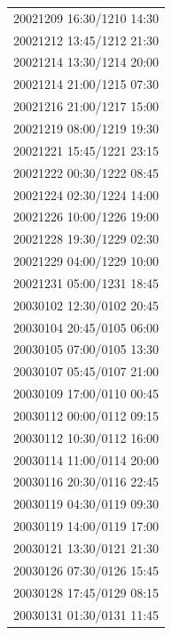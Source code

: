 \documentclass[linenumbers,draft]{agujournal}
\begin{document}
\begin{center}
\begin{longtable}{c}
20021209 16:30/1210 14:30 \\
20021212 13:45/1212 21:30 \\
20021214 13:30/1214 20:00 \\
20021214 21:00/1215 07:30 \\
20021216 21:00/1217 15:00 \\
20021219 08:00/1219 19:30 \\
20021221 15:45/1221 23:15 \\
20021222 00:30/1222 08:45 \\
20021224 02:30/1224 14:00 \\
20021226 10:00/1226 19:00 \\
20021228 19:30/1229 02:30 \\
20021229 04:00/1229 10:00 \\
20021231 05:00/1231 18:45 \\
20030102 12:30/0102 20:45 \\
20030104 20:45/0105 06:00 \\
20030105 07:00/0105 13:30 \\
20030107 05:45/0107 21:00 \\
20030109 17:00/0110 00:45 \\
20030112 00:00/0112 09:15 \\
20030112 10:30/0112 16:00 \\
20030114 11:00/0114 20:00 \\
20030116 20:30/0116 22:45 \\
20030119 04:30/0119 09:30 \\
20030119 14:00/0119 17:00 \\
20030121 13:30/0121 21:30 \\
20030126 07:30/0126 15:45 \\
20030128 17:45/0129 08:15 \\
20030131 01:30/0131 11:45 \\
\end{longtable}
\end{center}

\pagebreak
\end{document}
